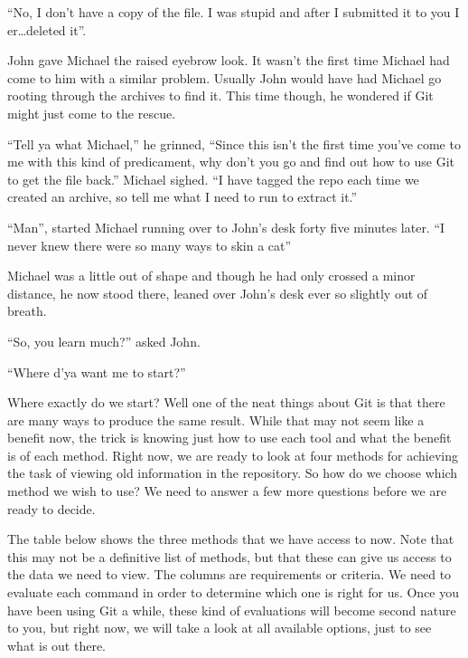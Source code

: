 \begin{trenches}
``No, I don't have a copy of the file.
I was stupid and after I submitted it to you I er\ldots deleted it''.

John gave Michael the raised eyebrow look.
It wasn't the first time Michael had come to him with a similar problem.
Usually John would have had Michael go rooting through the archives to find it.
This time though, he wondered if Git might just come to the rescue.

``Tell ya what Michael,'' he grinned,
``Since this isn't the first time you've come to me with this kind of predicament, why don't you go and find out how to use Git to get the file back.'' Michael sighed.
``I have tagged the repo each time we created an archive, so tell me what I need to run to extract it.''

\thoughtbreak

``Man'', started Michael running over to John's desk forty five minutes later.
``I never knew there were so many ways to skin a cat''

Michael was a little out of shape and though he had only crossed a minor distance, he now stood there, leaned over John's desk ever so slightly out of breath.

``So, you learn much?'' asked John.

``Where d'ya want me to start?''

\end{trenches}

Where exactly do we start? Well one of the neat things about Git is that there are many ways to produce the same result.
While that may not seem like a benefit now, the trick is knowing just how to use each tool and what the benefit is of each method.
Right now, we are ready to look at four methods for achieving the task of viewing old information in the repository.
So how do we choose which method we wish to use? We need to answer a few more questions before we are ready to decide.

The table below shows the three methods that we have access to now.
Note that this may not be a definitive list of methods, but that these can give us access to the data we need to view.
The columns are requirements or criteria.
We need to evaluate each command in order to determine which one is right for us.
Once you have been using Git a while, these kind of evaluations will become second nature to you, but right now, we will take a look at all available options, just to see what is out there.

